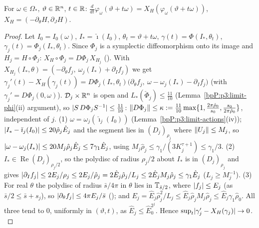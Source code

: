 \begin{lemma}[Invariance]\label{bpP:p3:invariance}
For $\omega\in\Omega_*$, $\vartheta\in\mathbb{R}^n$, $t\in\mathbb{R}$: $\frac{d}{dt}\varphi_\omega(\vartheta+t\omega)=X_H(\varphi_\omega(\vartheta+t\omega))$, $X_H=(-\partial_\theta H,\partial_JH)$.
\end{lemma}
\begin{proof}
Let $I_0=I_0(\omega)$, $I_*=\check\imath(I_0)$, $\theta_t=\vartheta+t\omega$, $\gamma(t)=\Phi(I_*,\theta_t)$, $\gamma_j(t)=\Phi_j(I_*,\theta_t)$.
\label{stepP:p3:inv-conj}
Since $\Phi_j$ is a symplectic diffeomorphism onto its image and $H_j=H\circ\Phi_j$: $X_H\circ\Phi_j=D\Phi_j\,X_{H_j}$ (). With $X_{H_j}(I_*,\theta)=(-\partial_\theta f_j,\ \omega_j(I_*)+\partial_If_j)$ we get
$\gamma_j'(t)-X_H(\gamma_j(t))=D\Phi_j(I_*,\theta_t)\bigl(\partial_\theta f_j,\ \omega-\omega_j(I_*)-\partial_If_j\bigr)$ (with $\gamma_j'=D\Phi_j(0,\omega)$).
\label{stepP:p3:inv-dphi}
$\mathcal D_j\times\mathbb{R}^n$ is open and $L_*(\check\Phi_j)\le\frac{11}{10}$ (Lemma~\ref{bpP:p3:limit-phi}(ii) argument), so $\lvert S\,D\Phi_jS^{-1}\rvert\le\frac{11}{10}$: $\lVert D\Phi_j\rVert\le\kappa:=\frac{11}{10}\max\{1,\tfrac{2\pi\hat\rho_0}{s_0},\tfrac{s_0}{2\pi\hat\rho_0}\}$, independent of $j$.
\label{stepP:p3:inv-err}
(1) $\omega=\omega_j(\check\imath_j(I_0))$ (Lemma~\ref{bpP:p3:limit-actions}(iv)); $\lvert I_*-\check\imath_j(I_0)\rvert\le20\hat\rho_j\hat E_j$ and the segment lies in $(D_j)_{\rho_j}$ where $\lVert U_j\rVert\le M_j$, so $\lvert \omega-\omega_j(I_*)\rvert\le20M_j\hat\rho_j\hat E_j\le7\gamma_1\hat E_j$, using $M_j\hat\rho_j\le\gamma_1/(3K_j^{\tau+1})\le\gamma_1/3$.
(2) $I_*\in\operatorname{Re}(D_j)_{\rho_j/2}$, so the polydisc of radius $\rho_j/2$ about $I_*$ is in $(D_j)_{\rho_j}$ and  gives $\lvert \partial_If_j\rvert\le2E_j/\rho_j\le2E_j/\hat\rho_j=2\hat E_j\hat\rho_j/L_j\le2\hat E_jM_j\hat\rho_j\le\gamma_1\hat E_j$ ($L_j\ge M_j^{-1}$).
(3) For real $\theta$ the polydisc of radius $\bar s/4\pi$ in $\theta$ lies in $\mathbb{T}_{\bar s/2}$, where $\lvert f_j\rvert\le E_j$ (as $\bar s/2\le\bar s+s_j$), so $\lvert \partial_\theta f_j\rvert\le4\pi E_j/\bar s$ (); and $E_j=\hat E_j\hat\rho_j^2/L_j\le\hat E_j\hat\rho_jM_j\hat\rho_j\le\hat E_j\gamma_1\hat\rho_0$.
All three tend to $0$, uniformly in $(\vartheta,t)$, as $\hat E_j\le\hat E_0^{2^j}$. Hence $\sup_t\lvert \gamma_j'-X_H(\gamma_j)\rvert\to0$.
\label{stepP:p3:inv-lim}

\end{proof}
